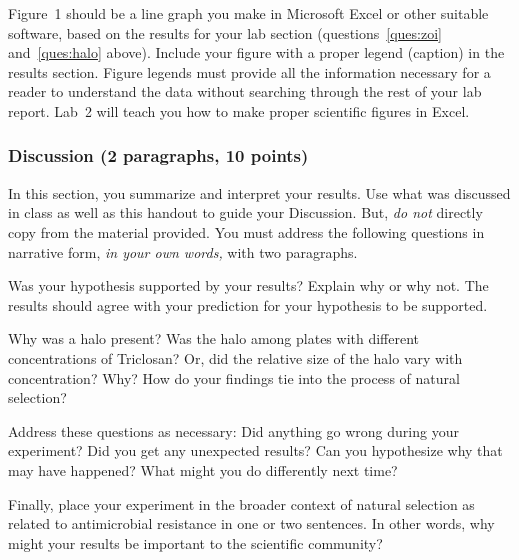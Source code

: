 \documentclass[12pt]{exam}
\begin{document}

Figure~1 should be a line graph you make in Microsoft Excel or other suitable software, based on the results for your lab section (questions~\ref{ques:zoi} and~\ref{ques:halo} above). Include your figure with a proper legend (caption) in the results section. Figure legends
must provide all the information necessary for a reader to understand
the data without searching through the rest of your lab report. Lab~2 will teach you how to make proper scientific figures in Excel.


\subsubsection*{Discussion (2 paragraphs, 10 points)} 

In this section, you summarize and interpret your results. Use what
was discussed in class as well as this handout to guide
your Discussion. But, \emph{do not} directly copy from the material provided.
You must address the following questions in narrative form, \emph{in your own words,} with two
paragraphs.

Was your hypothesis supported by your results? Explain why or why not. 
The results should agree with your prediction for your hypothesis to be supported. 

Why was a halo present? Was the halo among plates with different
concentrations of Triclosan? Or, did the relative size of the halo vary
with concentration? Why? How do your findings tie into the
process of natural selection?

Address these questions as necessary: Did anything go wrong during your
experiment? Did you get any unexpected results? Can you hypothesize
why that may have happened? What might you do differently next time?

Finally, place your experiment in the broader context of natural
selection as related to antimicrobial resistance in one or two
sentences. In other words, why might your results be important to the
scientific community?




	
\end{document}
